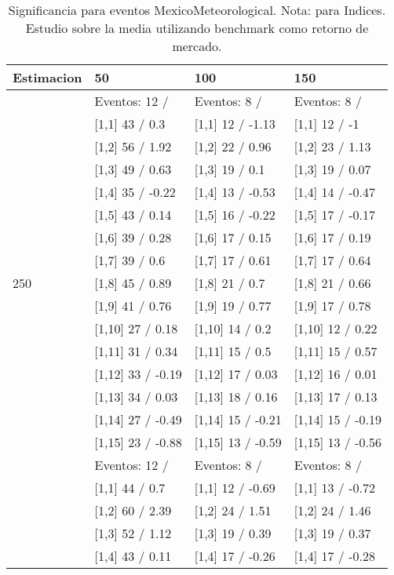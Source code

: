 \begin{table}

\caption{Significancia para eventos MexicoMeteorological. Nota: para Indices. Estudio sobre la media utilizando benchmark como retorno de mercado.}
\centering
\begin{tabular}[t]{llll}
\toprule
Estimacion & 50 & 100 & 150\\
\midrule
 & Eventos:  12 / & Eventos:  8 / & Eventos:  8 /\\
 & {}[1,1] 43  / 0.3 & {}[1,1] 12  / -1.13 & {}[1,1] 12  / -1\\
 & {}[1,2] 56  / 1.92 & {}[1,2] 22  / 0.96 & {}[1,2] 23  / 1.13\\
 & {}[1,3] 49  / 0.63 & {}[1,3] 19  / 0.1 & {}[1,3] 19  / 0.07\\
 & {}[1,4] 35  / -0.22 & {}[1,4] 13  / -0.53 & {}[1,4] 14  / -0.47\\
\addlinespace
 & {}[1,5] 43  / 0.14 & {}[1,5] 16  / -0.22 & {}[1,5] 17  / -0.17\\
 & {}[1,6] 39  / 0.28 & {}[1,6] 17  / 0.15 & {}[1,6] 17  / 0.19\\
 & {}[1,7] 39  / 0.6 & {}[1,7] 17  / 0.61 & {}[1,7] 17  / 0.64\\
250 & {}[1,8] 45  / 0.89 & {}[1,8] 21  / 0.7 & {}[1,8] 21  / 0.66\\
 & {}[1,9] 41  / 0.76 & {}[1,9] 19  / 0.77 & {}[1,9] 17  / 0.78\\
\addlinespace
 & {}[1,10] 27  / 0.18 & {}[1,10] 14  / 0.2 & {}[1,10] 12  / 0.22\\
 & {}[1,11] 31  / 0.34 & {}[1,11] 15  / 0.5 & {}[1,11] 15  / 0.57\\
 & {}[1,12] 33  / -0.19 & {}[1,12] 17  / 0.03 & {}[1,12] 16  / 0.01\\
 & {}[1,13] 34  / 0.03 & {}[1,13] 18  / 0.16 & {}[1,13] 17  / 0.13\\
 & {}[1,14] 27  / -0.49 & {}[1,14] 15  / -0.21 & {}[1,14] 15  / -0.19\\
\addlinespace
 & {}[1,15] 23  / -0.88 & {}[1,15] 13  / -0.59 & {}[1,15] 13  / -0.56\\
 & Eventos:  12 / & Eventos:  8 / & Eventos:  8 /\\
 & {}[1,1] 44  / 0.7 & {}[1,1] 12  / -0.69 & {}[1,1] 13  / -0.72\\
 & {}[1,2] 60  / 2.39 & {}[1,2] 24  / 1.51 & {}[1,2] 24  / 1.46\\
 & {}[1,3] 52  / 1.12 & {}[1,3] 19  / 0.39 & {}[1,3] 19  / 0.37\\
\addlinespace
 & {}[1,4] 43  / 0.11 & {}[1,4] 17  / -0.26 & {}[1,4] 17  / -0.28\\

\end{tabular}
\end{table}
